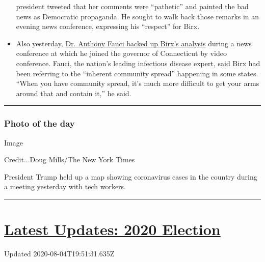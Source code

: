 \begin{itemize}
  president tweeted that her comments were ``pathetic'' and painted the
  bad news as Democratic propaganda. He sought to walk back those
  remarks in an evening news conference, expressing his ``respect'' for
  Birx.
\item
  Also yesterday,
  \href{https://www.nytimes3xbfgragh.onion/2020/08/03/world/coronavirus-covid-19.html\#link-4e40df05}{Dr.
  Anthony Fauci backed up Birx's analysis} during a news conference at
  which he joined the governor of Connecticut by video conference.
  Fauci, the nation's leading infectious disease expert, said Birx had
  been referring to the ``inherent community spread'' happening in some
  states. ``When you have community spread, it's much more difficult to
  get your arms around that and contain it,'' he said.
\end{itemize}

\begin{center}\rule{0.5\linewidth}{\linethickness}\end{center}

\hypertarget{photo-of-the-day}{%
\subsubsection{Photo of the day}\label{photo-of-the-day}}

Image

Credit...Doug Mills/The New York Times

President Trump held up a map showing coronavirus cases in the country
during a meeting yesterday with tech workers.

\begin{center}\rule{0.5\linewidth}{\linethickness}\end{center}

\hypertarget{latest-updates-2020-election}{%
\section{\texorpdfstring{\href{https://www.nytimes3xbfgragh.onion/2020/08/04/us/elections/primary-election-michigan-arizona-kansas.html?action=click\&pgtype=Article\&state=default\&region=MAIN_CONTENT_1\&context=storylines_live_updates}{Latest
Updates: 2020
Election}}{Latest Updates: 2020 Election}}\label{latest-updates-2020-election}}

Updated 2020-08-04T19:51:31.635Z


